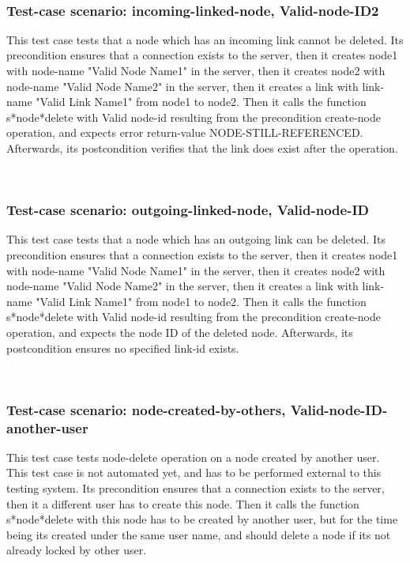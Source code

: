 \
\subsubsection {Test-case scenario: incoming-linked-node, Valid-node-ID2}


This test case tests that a node which has an incoming link cannot be deleted.
Its precondition ensures that a connection exists to the server, then it creates node1 with node-name "Valid Node Name1" in the server, then it creates node2 with node-name  "Valid Node Name2" in the server, then it creates a link with link-name "Valid Link Name1" from node1 to node2.
Then it calls the function s*node*delete  with Valid node-id resulting from the precondition create-node operation, and expects error return-value NODE-STILL-REFERENCED.
Afterwards, its postcondition verifies that the link does exist after the operation.




\
\subsubsection {Test-case scenario: outgoing-linked-node, Valid-node-ID}


This test case tests that a node which has an outgoing link can be deleted.
Its precondition ensures that a connection exists to the server, then it creates node1 with node-name "Valid Node Name1" in the server, then it creates node2 with node-name  "Valid Node Name2" in the server, then it creates a link with link-name "Valid Link Name1" from node1 to node2.
Then it calls the function s*node*delete  with Valid node-id resulting from the precondition create-node operation, and expects the node ID of the deleted node.
Afterwards, its postcondition ensures no specified link-id exists.




\
\subsubsection {Test-case scenario: node-created-by-others, Valid-node-ID-another-user}


This test case tests node-delete operation on a node created by another user.  This test case is not automated yet, and has to be performed external to this testing system.
Its precondition ensures that a connection exists to the server, then it a different user has to create this node.
Then it calls the function s*node*delete  with this node has to be created by another user, but for the time being its created under the same user name, and should delete a node if its not already locked by other user.



